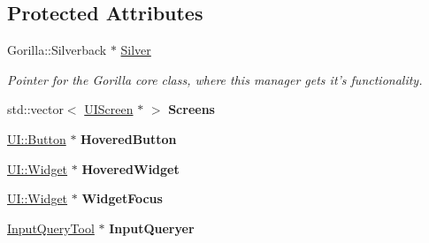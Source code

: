 \subsection*{Protected Attributes}
\begin{DoxyCompactItemize}
\item 
\hypertarget{classphys_1_1UIManager_ab4c5b8c7e3c4c7b03847b1af18bea02a}{
Gorilla::Silverback $\ast$ \hyperlink{classphys_1_1UIManager_ab4c5b8c7e3c4c7b03847b1af18bea02a}{Silver}}
\label{d5/dc5/classphys_1_1UIManager_ab4c5b8c7e3c4c7b03847b1af18bea02a}

\begin{DoxyCompactList}\small\item\em Pointer for the Gorilla core class, where this manager gets it's functionality. \item\end{DoxyCompactList}\item 
\hypertarget{classphys_1_1UIManager_ab8eb94c63e1be1acda3891cd1862cc4e}{
std::vector$<$ \hyperlink{classphys_1_1UIScreen}{UIScreen} $\ast$ $>$ {\bfseries Screens}}
\label{d5/dc5/classphys_1_1UIManager_ab8eb94c63e1be1acda3891cd1862cc4e}

\item 
\hypertarget{classphys_1_1UIManager_a37293b9d9ba8b05c9a03e4640a56c6c1}{
\hyperlink{classphys_1_1UI_1_1Button}{UI::Button} $\ast$ {\bfseries HoveredButton}}
\label{d5/dc5/classphys_1_1UIManager_a37293b9d9ba8b05c9a03e4640a56c6c1}

\item 
\hypertarget{classphys_1_1UIManager_a3bcf192e061273695e99a85484c5056a}{
\hyperlink{classphys_1_1UI_1_1Widget}{UI::Widget} $\ast$ {\bfseries HoveredWidget}}
\label{d5/dc5/classphys_1_1UIManager_a3bcf192e061273695e99a85484c5056a}

\item 
\hypertarget{classphys_1_1UIManager_a932c928b9246717725c264326660bd6d}{
\hyperlink{classphys_1_1UI_1_1Widget}{UI::Widget} $\ast$ {\bfseries WidgetFocus}}
\label{d5/dc5/classphys_1_1UIManager_a932c928b9246717725c264326660bd6d}

\item 
\hypertarget{classphys_1_1UIManager_a0ae28b65bf930af50026f410b449d43b}{
\hyperlink{classphys_1_1InputQueryTool}{InputQueryTool} $\ast$ {\bfseries InputQueryer}}
\label{d5/dc5/classphys_1_1UIManager_a0ae28b65bf930af50026f410b449d43b}

\end{DoxyCompactItemize}



